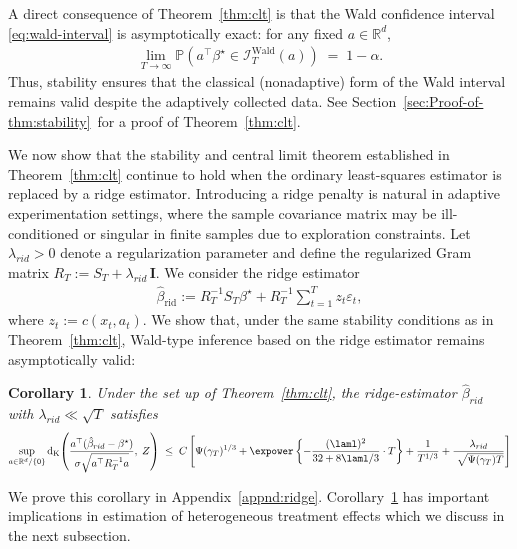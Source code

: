 \documentclass[11pt,letterpaper]{article}
\newcommand{\Prob}{\mathbb{P}}
\newcommand{\rpen}{\lambda_{rid}}
\newcommand{\real}{\mathbb{R}}
\newcommand{\Id}{\mathbf{I}}
\newcommand{\z}{z}
\newcommand{\dist}{\operatorname{d}_{\operatorname{K}}}
\theoremstyle{plain}
\newtheorem{corollary}{Corollary}
\theoremstyle{definition}  %
\begin{document}
\noindent  
A direct consequence of Theorem~\ref{thm:clt} is that the Wald confidence interval
\eqref{eq:wald-interval} is asymptotically exact: for any fixed $a \in \mathbb{R}^d$,
\begin{align*}
    \lim_{T \to \infty}
    \Prob\!\left( 
        a^\top \beta^\star \in \mathcal{I}^{\mathrm{Wald}}_T(a)
    \right)
    \;=\;
    1 - \alpha.
\end{align*}
Thus, stability ensures that the classical (nonadaptive) form of the Wald interval remains 
valid despite the adaptively collected data. See Section~\ref{sec:Proof-of-thm:stability}~for a proof of Theorem~\ref{thm:clt}. 
%


We now show that the stability and central limit theorem established in
Theorem~\ref{thm:clt} continue to hold when the ordinary least-squares estimator is
replaced by a ridge estimator. Introducing a ridge penalty is natural in adaptive
experimentation settings, where the sample covariance matrix may be ill-conditioned or
singular in finite samples due to exploration constraints. Let $\rpen > 0$ denote a
regularization parameter and define the regularized Gram matrix
$R_T := S_T + \rpen \,\Id$. We consider the ridge estimator
\begin{align}
   \widehat{\beta}_{\mathrm{rid}}
:= R_T^{-1} S_T \beta^\star + R_T^{-1} \sum_{t=1}^T \z_t \varepsilon_t, 
\end{align}
where $\z_t := c(x_t,a_t)$. We show that, under the same stability conditions as in
Theorem~\ref{thm:clt}, Wald-type inference based on the ridge estimator remains
asymptotically valid:
\begin{corollary}\label{cor:rid}
    Under the set up of Theorem~\ref{thm:clt}, the ridge-estimator $\hat{\beta}_{rid}$ with $\rpen \ll \sqrt{T} $ satisfies 
%
\begin{align}
\notag
   \sup_{a \in \real^d / \{0\}} \dist\!\left(
        \frac{a^{\top}(\hat{\beta}_{rid} - \beta^\star)}
             {\sigma \sqrt{a^\top R_T^{-1} a}},\;
        Z
    \right)\;\leq\; C \left[
     \Psi(\gamma_T)^{1/3}  + \expower\left\{ - \frac{(\laml)^2}{32 +  8\laml/3} \cdot  T\right\} + \frac{1}{T^{1/3}}
    + \frac{\rpen}{ \ \sqrt{\Psi(\gamma_T) T}} \right] 
\end{align}
%
\end{corollary}
We prove this corollary in Appendix~\ref{appnd:ridge}. Corollary~\ref{cor:rid} has important implications in estimation of heterogeneous treatment effects which we discuss in the next subsection.
\end{document}
